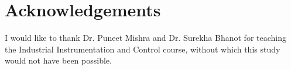 \section{Acknowledgements}

I would like to thank Dr. Puneet Mishra and Dr. Surekha Bhanot for teaching the Industrial Instrumentation and Control course, without which this study would not have been possible.